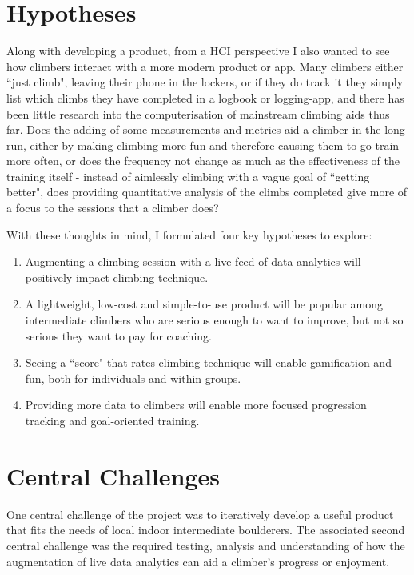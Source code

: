 \section{Hypotheses}
Along with developing a product, from a HCI perspective I also wanted to see how climbers interact with a more modern product or app.
Many climbers either ``just climb", leaving their phone in the lockers, or if they do track it they simply list which climbs they have completed in a logbook or logging-app, and there has been little research into the computerisation of mainstream climbing aids thus far.
Does the adding of some measurements and metrics aid a climber in the long run,
either by making climbing more fun and therefore causing them to go train more often, or does the frequency not change as much as the effectiveness of the training itself - instead of aimlessly climbing with a vague goal of ``getting better", does providing quantitative analysis of the climbs completed give more of a focus to the sessions that a climber does?


With these thoughts in mind, I formulated four key hypotheses to explore:
\begin{enumerate}
    \item Augmenting a climbing session with a live-feed of data analytics will positively impact climbing technique.
    \item A lightweight, low-cost and simple-to-use product will be popular among intermediate climbers who are serious enough to want to improve, but not so serious they want to pay for coaching.
    \item Seeing a ``score" that rates climbing technique will enable gamification and fun, both for individuals and within groups.
    \item Providing more data to climbers will enable more focused progression tracking and goal-oriented training.
\end{enumerate}



\section{Central Challenges}
One central challenge of the project was to iteratively develop a useful product that fits the needs of local indoor intermediate boulderers.
The associated second central challenge was the required testing, analysis and understanding of how the augmentation of live data analytics can aid a climber's progress or enjoyment.


